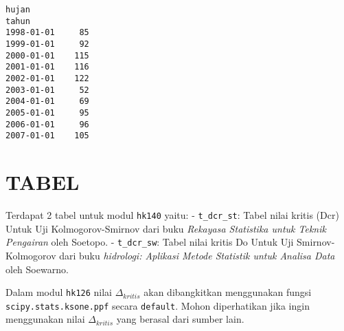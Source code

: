 \documentclass[11pt]{article}
\makeatletter
\newcommand{\boxspacing}{\kern\kvtcb@left@rule\kern\kvtcb@boxsep}
\newcommand{\prompt}[4]{
        {\ttfamily\llap{{\color{#2}[#3]:\hspace{3pt}#4}}\vspace{-\baselineskip}}
    }
\makeatother
\begin{document}
            \begin{tcolorbox}[breakable, size=fbox, boxrule=.5pt, pad at break*=1mm, opacityfill=0]
\prompt{Out}{outcolor}{ }{\boxspacing}
\begin{Verbatim}[commandchars=\\\{\}]
            hujan
tahun
1998-01-01     85
1999-01-01     92
2000-01-01    115
2001-01-01    116
2002-01-01    122
2003-01-01     52
2004-01-01     69
2005-01-01     95
2006-01-01     96
2007-01-01    105
\end{Verbatim}
\end{tcolorbox}
        
    \hypertarget{tabel}{%
\section{TABEL}\label{tabel}}

Terdapat 2 tabel untuk modul \texttt{hk140} yaitu: -
\texttt{t\_dcr\_st}: Tabel nilai kritis (Dcr) Untuk Uji
Kolmogorov-Smirnov dari buku \emph{Rekayasa Statistika untuk Teknik
Pengairan} oleh Soetopo. - \texttt{t\_dcr\_sw}: Tabel nilai kritis Do
Untuk Uji Smirnov-Kolmogorov dari buku \emph{hidrologi: Aplikasi Metode
Statistik untuk Analisa Data} oleh Soewarno.

Dalam modul \texttt{hk126} nilai \(\Delta_{kritis}\) akan dibangkitkan
menggunakan fungsi \texttt{scipy.stats.ksone.ppf} secara
\texttt{default}. Mohon diperhatikan jika ingin menggunakan nilai
\(\Delta_{kritis}\) yang berasal dari sumber lain.
\end{document}
